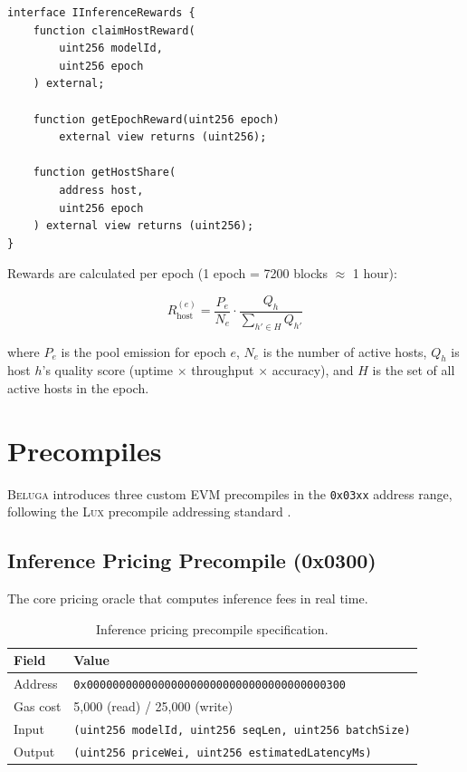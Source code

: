 \documentclass[11pt,letterpaper]{article}
\newcommand{\Lux}{\textsc{Lux}}
\newcommand{\Beluga}{\textsc{Beluga}}
\begin{document}
\begin{lstlisting}[language=Solidity,caption=InferenceRewards distribution]
interface IInferenceRewards {
    function claimHostReward(
        uint256 modelId,
        uint256 epoch
    ) external;

    function getEpochReward(uint256 epoch)
        external view returns (uint256);

    function getHostShare(
        address host,
        uint256 epoch
    ) external view returns (uint256);
}
\end{lstlisting}

Rewards are calculated per epoch (1 epoch = 7200 blocks $\approx$ 1 hour):

\begin{equation}
R_{\text{host}}^{(e)} = \frac{P_e}{N_e} \cdot \frac{Q_h}{\sum_{h' \in H} Q_{h'}}
\end{equation}

where $P_e$ is the pool emission for epoch $e$, $N_e$ is the number of active hosts, $Q_h$ is host $h$'s quality score (uptime $\times$ throughput $\times$ accuracy), and $H$ is the set of all active hosts in the epoch.

\section{Precompiles}\label{sec:precompiles}

\Beluga{} introduces three custom EVM precompiles in the \texttt{0x03xx} address range, following the \Lux{} precompile addressing standard \cite{lux-precompiles}.

\subsection{Inference Pricing Precompile (0x0300)}

The core pricing oracle that computes inference fees in real time.

\begin{table}[h]
\centering
\caption{Inference pricing precompile specification.}
\label{tab:precompile-0300}
\begin{tabular}{@{}ll@{}}
\toprule
Field & Value \\
\midrule
Address & \texttt{0x0000000000000000000000000000000000000300} \\
Gas cost & 5,000 (read) / 25,000 (write) \\
Input & \texttt{(uint256 modelId, uint256 seqLen, uint256 batchSize)} \\
Output & \texttt{(uint256 priceWei, uint256 estimatedLatencyMs)} \\
\bottomrule
\end{tabular}
\end{table}
\end{document}
